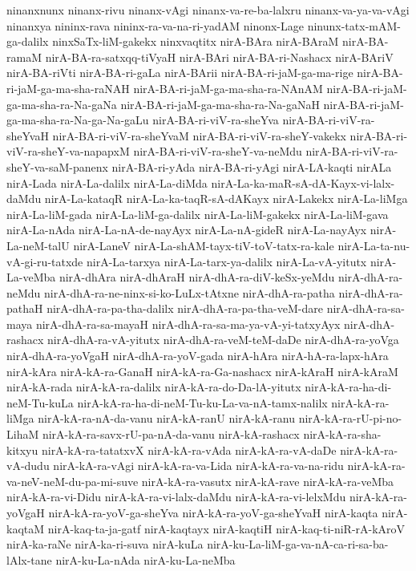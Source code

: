 {ninanxnunx
ninanx-rivu
ninanx-vAgi
ninanx-va-re-ba-lalxru
ninanx-va-ya-va-vAgi
ninanxya
nininx-rava
nininx-ra-va-na-ri-yadAM
ninonx-Lage
ninunx-tatx-mAM-ga-dalilx
ninxSaTx-liM-gakekx
ninxvaqtitx
nirA-BAra
nirA-BAraM
nirA-BA-ramaM
nirA-BA-ra-satxqq-tiVyaH
nirA-BAri
nirA-BA-ri-Nashacx
nirA-BAriV
nirA-BA-riVti
nirA-BA-ri-gaLa
nirA-BArii
nirA-BA-ri-jaM-ga-ma-rige
nirA-BA-ri-jaM-ga-ma-sha-raNAH
nirA-BA-ri-jaM-ga-ma-sha-ra-NAnAM
nirA-BA-ri-jaM-ga-ma-sha-ra-Na-gaNa
nirA-BA-ri-jaM-ga-ma-sha-ra-Na-gaNaH
nirA-BA-ri-jaM-ga-ma-sha-ra-Na-ga-Na-gaLu
nirA-BA-ri-viV-ra-sheYva
nirA-BA-ri-viV-ra-sheYvaH
nirA-BA-ri-viV-ra-sheYvaM
nirA-BA-ri-viV-ra-sheY-vakekx
nirA-BA-ri-viV-ra-sheY-va-napapxM
nirA-BA-ri-viV-ra-sheY-va-neMdu
nirA-BA-ri-viV-ra-sheY-va-saM-panenx
nirA-BA-ri-yAda
nirA-BA-ri-yAgi
nirA-LA-kaqti
nirALa
nirA-Lada
nirA-La-dalilx
nirA-La-diMda
nirA-La-ka-maR-sA-dA-Kayx-vi-lalx-daMdu
nirA-La-kataqR
nirA-La-ka-taqR-sA-dAKayx
nirA-Lakekx
nirA-La-liMga
nirA-La-liM-gada
nirA-La-liM-ga-dalilx
nirA-La-liM-gakekx
nirA-La-liM-gava
nirA-La-nAda
nirA-La-nA-de-nayAyx
nirA-La-nA-gideR
nirA-La-nayAyx
nirA-La-neM-talU
nirA-LaneV
nirA-La-shAM-tayx-tiV-toV-tatx-ra-kale
nirA-La-ta-nu-vA-gi-ru-tatxde
nirA-La-tarxya
nirA-La-tarx-ya-dalilx
nirA-La-vA-yitutx
nirA-La-veMba
nirA-dhAra
nirA-dhAraH
nirA-dhA-ra-diV-keSx-yeMdu
nirA-dhA-ra-neMdu
nirA-dhA-ra-ne-ninx-si-ko-LuLx-tAtxne
nirA-dhA-ra-patha
nirA-dhA-ra-pathaH
nirA-dhA-ra-pa-tha-dalilx
nirA-dhA-ra-pa-tha-veM-dare
nirA-dhA-ra-sa-maya
nirA-dhA-ra-sa-mayaH
nirA-dhA-ra-sa-ma-ya-vA-yi-tatxyAyx
nirA-dhA-rashacx
nirA-dhA-ra-vA-yitutx
nirA-dhA-ra-veM-teM-daDe
nirA-dhA-ra-yoVga
nirA-dhA-ra-yoVgaH
nirA-dhA-ra-yoV-gada
nirA-hAra
nirA-hA-ra-lapx-hAra
nirA-kAra
nirA-kA-ra-GanaH
nirA-kA-ra-Ga-nashacx
nirA-kAraH
nirA-kAraM
nirA-kA-rada
nirA-kA-ra-dalilx
nirA-kA-ra-do-Da-lA-yitutx
nirA-kA-ra-ha-di-neM-Tu-kuLa
nirA-kA-ra-ha-di-neM-Tu-ku-La-va-nA-tamx-nalilx
nirA-kA-ra-liMga
nirA-kA-ra-nA-da-vanu
nirA-kA-ranU
nirA-kA-ranu
nirA-kA-ra-rU-pi-no-LihaM
nirA-kA-ra-savx-rU-pa-nA-da-vanu
nirA-kA-rashacx
nirA-kA-ra-sha-kitxyu
nirA-kA-ra-tatatxvX
nirA-kA-ra-vAda
nirA-kA-ra-vA-daDe
nirA-kA-ra-vA-dudu
nirA-kA-ra-vAgi
nirA-kA-ra-va-Lida
nirA-kA-ra-va-na-ridu
nirA-kA-ra-va-neV-neM-du-pa-mi-suve
nirA-kA-ra-vasutx
nirA-kA-rave
nirA-kA-ra-veMba
nirA-kA-ra-vi-Didu
nirA-kA-ra-vi-lalx-daMdu
nirA-kA-ra-vi-lelxMdu
nirA-kA-ra-yoVgaH
nirA-kA-ra-yoV-ga-sheYva
nirA-kA-ra-yoV-ga-sheYvaH
nirA-kaqta
nirA-kaqtaM
nirA-kaq-ta-ja-gatf
nirA-kaqtayx
nirA-kaqtiH
nirA-kaq-ti-niR-rA-kAroV
nirA-ka-raNe
nirA-ka-ri-suva
nirA-kuLa
nirA-ku-La-liM-ga-va-nA-ca-ri-sa-ba-lAlx-tane
nirA-ku-La-nAda
nirA-ku-La-neMba
}
